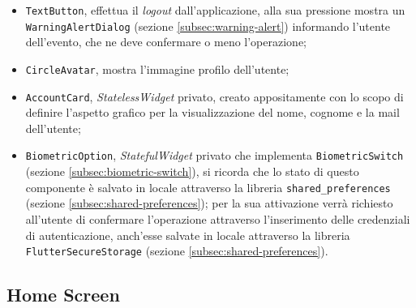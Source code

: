 \begin{itemize}
    \item \lstinline{TextButton}\cite{site:text-button}, effettua il \emph{logout} dall'applicazione, alla sua pressione mostra un \lstinline{WarningAlertDialog} (sezione \ref{subsec:warning-alert}) informando l'utente dell'evento, che ne deve confermare o meno l'operazione;
    \item \lstinline{CircleAvatar}\cite{site:circle-avatar}, mostra l'immagine profilo dell'utente;
    \item \lstinline{AccountCard}, \emph{StatelessWidget} privato, creato appositamente con lo scopo di definire l'aspetto grafico per la visualizzazione del nome, cognome e la mail dell'utente;
    \item \lstinline{BiometricOption}, \emph{StatefulWidget} privato che implementa \lstinline{BiometricSwitch} (sezione \ref{subsec:biometric-switch}), si ricorda che lo stato di questo componente è salvato in locale attraverso la libreria \lstinline{shared_preferences}\cite{site:shared-preferences} (sezione \ref{subsec:shared-preferences}); per la sua attivazione verrà richiesto all'utente di confermare l'operazione attraverso l'inserimento delle credenziali di autenticazione, anch'esse salvate in locale attraverso la libreria \lstinline{FlutterSecureStorage}\cite{site:flutter-secure-storage} (sezione \ref{subsec:shared-preferences}).
\end{itemize}


\subsection{Home Screen}
\label{subsec:home-screen}


